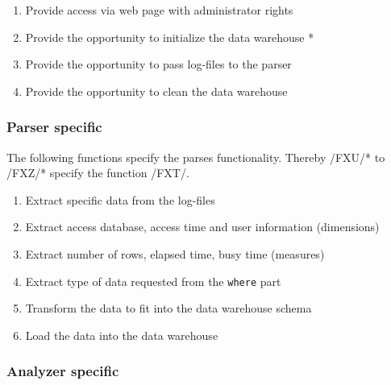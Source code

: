\begin{enumerate}[resume]
  
  \item Provide access via web page with administrator rights
   
  \item Provide the opportunity to initialize the data warehouse * %
   
  \item Provide the opportunity to pass log-files to the parser
  
  \item Provide the opportunity to clean the data warehouse
   
\end{enumerate}


\subsubsection*{Parser specific}
 
 The following functions specify the parses functionality. Thereby /FXU/* to /FXZ/* specify
 the function /FXT/.
 
\begin{enumerate}[resume]
  
  \item Extract specific data from the log-files
  
  \item Extract access database, access time and user information (dimensions) %
  
  \item Extract number of rows, elapsed time, busy time (measures) %
  
  \item Extract type of data requested from the \texttt{where} part %
  
  \item Transform the data to fit into the data warehouse schema
  
  \item Load the data into the data warehouse

\end{enumerate}

\subsubsection*{Analyzer specific}
 
